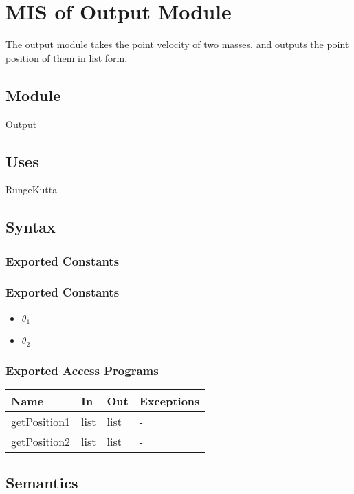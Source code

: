 \documentclass[12pt, titlepage]{article}
\begin{document}
\section{MIS of Output Module} \label{OModule} 
The output module takes the point velocity of two masses, and outputs the point position of them in list form.

\subsection{Module}
Output

\subsection{Uses}
RungeKutta

\subsection{Syntax}

\subsubsection{Exported Constants}
\subsubsection{Exported Constants}
\begin{itemize}
  \item ${\theta_1}$
  \item ${\theta_2}$
\end{itemize}

\subsubsection{Exported Access Programs}

\begin{center}
\begin{tabular}{p{2cm} p{4cm} p{4cm} p{2cm}}
\hline
\textbf{Name} & \textbf{In} & \textbf{Out} & \textbf{Exceptions} \\
\hline
getPosition1 & list & list & - \\
\hline
getPosition2 & list & list & - \\
\hline
\end{tabular}
\end{center}

\subsection{Semantics}
\end{document}
